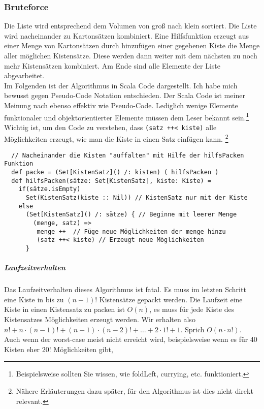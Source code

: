 \subsubsection{Bruteforce}
\lstset{language=Scala} %
\lstset{basicstyle=\scriptsize}
Die Liste wird entsprechend dem Volumen von groß nach klein sortiert.
Die Liste wird nacheinander zu Kartonsätzen kombiniert.
Eine Hilfsfunktion erzeugt aus einer Menge von Kartonsätzen durch hinzufügen einer gegebenen Kiste die Menge aller möglichen Kistensätze.
Diese werden dann weiter mit dem nächsten zu noch mehr Kistensätzen kombiniert.
Am Ende sind alle Elemente der Liste abgearbeitet. \\
Im Folgenden ist der Algorithmus in Scala Code dargestellt. Ich habe mich bewusst gegen Pseudo-Code Notation entschieden.
Der Scala Code ist meiner Meinung nach ebenso effektiv wie Pseudo-Code.
Lediglich wenige Elemente funktionaler und objektorientierter Elemente müssen dem Leser bekannt sein.\footnote{Beispielsweise sollten Sie wissen, wie foldLeft, currying, etc. funktioniert.}\\
Wichtig ist, um den Code zu verstehen, dass \lstinline|(satz ++< kiste)| alle Möglichkeiten erzeugt, wie man die Kiste in einen Satz einfügen kann.
\footnote{Nähere Erläuterungen dazu später, für den Algorithmus ist dies nicht direkt relevant.}
\lstset{language=Scala}
\lstset{basicstyle=\scriptsize}
\begin{lstlisting}
  // Nacheinander die Kisten "auffalten" mit Hilfe der hilfsPacken Funktion
  def packe = (Set[KistenSatz]() /: kisten) ( hilfsPacken )
  def hilfsPacken(sätze: Set[KistenSatz], kiste: Kiste) =
    if(sätze.isEmpty)
      Set(KistenSatz(kiste :: Nil)) // KistenSatz nur mit der Kiste
    else
      (Set[KistenSatz]() /: sätze) { // Beginne mit leerer Menge
        (menge, satz) =>
         menge ++  // Füge neue Möglichkeiten der menge hinzu
         (satz ++< kiste) // Erzeugt neue Möglichkeiten
      }
\end{lstlisting}
\subparagraph{Laufzeitverhalten}
Das Laufzeitverhalten dieses Algorithmus ist fatal. Es muss im letzten Schritt eine Kiste in bis zu $(n-1)!$ Kistensätze gepackt werden.
Die Laufzeit eine Kiste in einen Kistensatz zu packen ist $O(n)$, es muss für jede Kiste des Kistensatzes Möglichkeiten erzeugt werden.
Wir erhalten also $n! + n \cdot (n-1)! +  (n-1) \cdot (n-2)! + \dots + 2 \cdot 1! + 1$. Sprich $O(n \cdot n!)$. \\
Auch wenn der worst-case meist nicht erreicht wird, beispielsweise wenn es für 40 Kisten eher $20!$ Möglichkeiten gibt,
